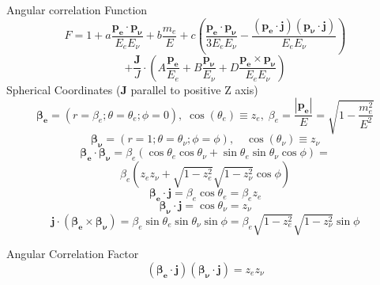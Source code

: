 \documentclass{beamer}
\begin{document}
\begin{frame}{Angular correlation Function}
	$$F = 1 + a \frac{\boldsymbol{p_e}\cdot\boldsymbol{p_\nu}}{E_eE_\nu} + b \frac{m_e}{E} + c \left(\frac{\boldsymbol{p_e}\cdot\boldsymbol{p_\nu}}{3E_eE_\nu}-\frac{(\boldsymbol{p_e}\cdot\boldsymbol{j})(\boldsymbol{p_\nu}\cdot\boldsymbol{j})}{E_eE_\nu}\right) $$$$+ \frac{\boldsymbol{J}}J\cdot\left(A \frac{\boldsymbol{p_e}}{E_e} + B \frac{\boldsymbol{p_\nu}}{E_\nu} + D \frac{\boldsymbol{p_e}\times\boldsymbol{p_\nu}}{E_eE_\nu}\right)$$
	Spherical Coordinates ($\boldsymbol{J}$ parallel to positive Z axis)
	$$\boldsymbol{\beta_e} = (r=\beta_e;\theta=\theta_e;\phi=0),\;\cos(\theta_e) \equiv z_e,\;\beta_e = \frac{|\boldsymbol{p_e}|}{E} = \sqrt{1-\frac{m_e^2}{E^2}}$$
	$$\boldsymbol{\beta_\nu} = (r=1;\theta=\theta_\nu;\phi=\phi),\quad\cos(\theta_\nu) \equiv z_\nu$$
	$$\boldsymbol{\beta_e}\cdot\boldsymbol{\beta_\nu} = \beta_e(\cos\theta_e\cos\theta_\nu + \sin\theta_e\sin\theta_\nu\cos\phi) =$$
	$$ \beta_e(z_ez_\nu + \sqrt{1-z^2_e}\sqrt{1-z^2_\nu}\cos\phi)$$
	$$\boldsymbol{\beta_e}\cdot\boldsymbol{j} = \beta_e\cos\theta_e=\beta_ez_e$$
	$$\boldsymbol{\beta_\nu}\cdot\boldsymbol{j} = \cos\theta_\nu=z_\nu$$
	$$\boldsymbol{j}\cdot(\boldsymbol{\beta_e}\times\boldsymbol{\beta_\nu})=\beta_e\sin\theta_e\sin\theta_\nu\sin\phi=\beta_e\sqrt{1-z^2_e}\sqrt{1-z^2_\nu}\sin\phi$$
\end{frame}	
\begin{frame}{Angular Correlation Factor}
	$$(\boldsymbol{\beta_e}\cdot\boldsymbol{j})(\boldsymbol{\beta_\nu}\cdot\boldsymbol{j}) = z_ez_\nu$$
\end{frame}
\end{document}

